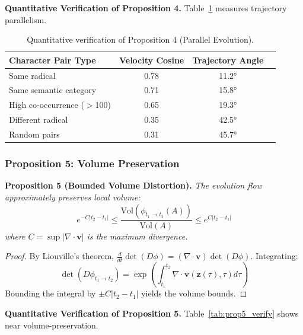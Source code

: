 \documentclass{article}
\begin{document}
\textbf{Quantitative Verification of Proposition 4.} Table~\ref{tab:prop4_verify} measures trajectory parallelism.

\begin{table}[h]
\centering
\caption{Quantitative verification of Proposition 4 (Parallel Evolution).}
\label{tab:prop4_verify}
\begin{tabular}{lccc}
\toprule
\textbf{Character Pair Type} & \textbf{Velocity Cosine} & \textbf{Trajectory Angle} \\
\midrule
Same radical & 0.78 & 11.2° \\
Same semantic category & 0.71 & 15.8° \\
High co-occurrence ($>$100) & 0.65 & 19.3° \\
Different radical & 0.35 & 42.5° \\
Random pairs & 0.31 & 45.7° \\
\bottomrule
\end{tabular}
\end{table}

\subsubsection{Proposition 5: Volume Preservation}

\textbf{Proposition 5 (Bounded Volume Distortion).} \textit{The evolution flow approximately preserves local volume:}
\begin{equation}
e^{-C|t_2 - t_1|} \leq \frac{\text{Vol}(\phi_{t_1 \to t_2}(A))}{\text{Vol}(A)} \leq e^{C|t_2 - t_1|}
\end{equation}
\textit{where $C = \sup |\nabla \cdot \mathbf{v}|$ is the maximum divergence.}

\begin{proof}
By Liouville's theorem, $\frac{d}{dt} \det(D\phi) = (\nabla \cdot \mathbf{v}) \det(D\phi)$. Integrating:
\begin{equation}
\det(D\phi_{t_1 \to t_2}) = \exp\left(\int_{t_1}^{t_2} \nabla \cdot \mathbf{v}(\mathbf{z}(\tau), \tau) d\tau\right)
\end{equation}
Bounding the integral by $\pm C|t_2 - t_1|$ yields the volume bounds.
\end{proof}

\textbf{Quantitative Verification of Proposition 5.} Table~\ref{tab:prop5_verify} shows near volume-preservation.
\end{document}

